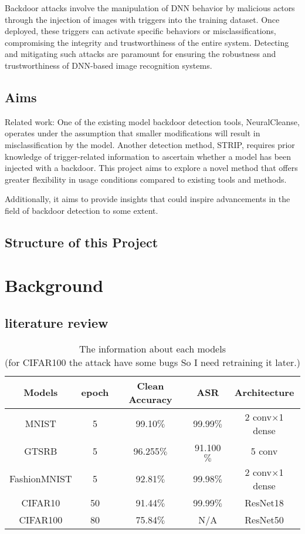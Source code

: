 \documentclass[12pt]{report}
\begin{document}
    Backdoor attacks involve the manipulation of DNN behavior by malicious actors through the 
    injection of images with triggers into the training dataset. Once deployed, these triggers 
    can activate specific behaviors or misclassifications, compromising the integrity and 
    trustworthiness of the entire system. Detecting and mitigating such attacks are paramount 
    for ensuring the robustness and trustworthiness of DNN-based image recognition systems.

\section{Aims}
    Related work: One of the existing model backdoor detection tools, NeuralCleanse, operates under 
    the assumption that smaller modifications will result in misclassification by the model. Another 
    detection method, STRIP, requires prior knowledge of trigger-related information to ascertain 
    whether a model has been injected with a backdoor. This project aims to explore a novel method 
    that offers greater flexibility in usage conditions compared to existing tools and methods. 
    
    Additionally, it aims to provide insights that could inspire advancements in the field of 
    backdoor detection to some extent.
\section{Structure of this Project}


\chapter{Background}
\section{literature review}


\begin{table*}[t]
    \centering
    \caption{The information about each models\\(for CIFAR100 the attack have some bugs So I need retraining it later.)}
    \label{table1}
    \begin{tabular}{|c|c|c|c|c|}
        \hline
        Models & epoch & Clean Accuracy & ASR & Architecture \\
        \hline
        MNIST & 5 & 99.10$\%$ & 99.99$\%$ &2 conv$\times$1 dense \\
        \hline
        GTSRB & 5 & 96.255$\%$ & 91.100$\%$ &5 conv \\
        \hline
        FashionMNIST & 5 & 92.81$\%$ & 99.98$\%$ & 2 conv$\times$1 dense \\
        \hline
        CIFAR10 & 50 & 91.44$\%$ & 99.99$\%$ & ResNet18 \\
        \hline
        CIFAR100 & 80 & 75.84$\%$ & N/A & ResNet50 \\
        \hline
    
        
    \end{tabular}
    
\end{table*}
\end{document}
